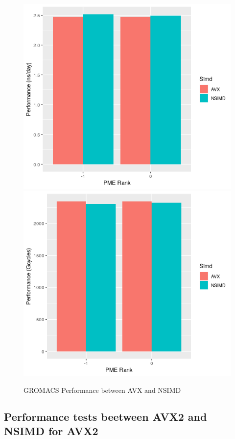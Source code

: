 \begin{figure}[!h]
\centering
        \includegraphics[scale=0.8]{AVX.png}
        \includegraphics[scale=0.8]{AVX_2.png}
        \caption{GROMACS Performance between AVX and NSIMD}
        \label{fg:f3}
\end{figure}
\newpage

\subsection{Performance tests beetween AVX2 and NSIMD for AVX2}
